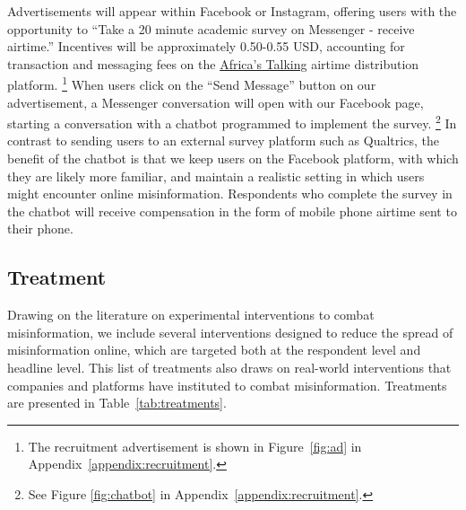 \documentclass[letterpaper, 12pt, parskip=full,]{scrartcl}
\begin{document}
Advertisements will appear within Facebook or Instagram, offering users with the opportunity to ``Take a 20 minute academic survey on Messenger - receive airtime.'' Incentives will be approximately 0.50-0.55 USD, accounting for transaction and messaging fees on the \href{https://africastalking.com/}{Africa's Talking} airtime distribution platform.%
\footnote{The recruitment advertisement is shown in Figure~\ref{fig:ad} in Appendix~\ref{appendix:recruitment}.} %
 When users click on the ``Send Message'' button on our advertisement, a Messenger conversation will open with our Facebook page, starting a conversation with a chatbot programmed to implement the survey.%
 \footnote{See Figure \ref{fig:chatbot} in Appendix~\ref{appendix:recruitment}.} %
 In contrast to sending users to an external survey platform such as Qualtrics, the benefit of the chatbot is that we keep users on the Facebook platform, with which they are likely more familiar, and maintain a realistic setting in which users might encounter online misinformation.  Respondents who complete the survey in the chatbot will receive compensation in the form of mobile phone airtime sent to their phone. %




\subsection{Treatment}
Drawing on the literature on experimental interventions to combat misinformation, we include several interventions designed to reduce the spread of misinformation online, which are targeted both at the respondent level and headline level. This list of treatments also draws on real-world interventions that companies and platforms have instituted to combat misinformation. Treatments are presented in Table~\ref{tab:treatments}. 

\end{document}
